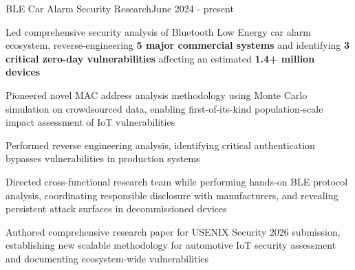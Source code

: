 \begin{joblong}{BLE Car Alarm Security Research}{June 2024 - present}
	\item Led comprehensive security analysis of Bluetooth Low Energy car alarm ecosystem, reverse-engineering \textbf{5 major commercial systems} and identifying \textbf{3 critical zero-day vulnerabilities} affecting an estimated \textbf{1.4+ million devices}
	\item Pioneered novel MAC address analysis methodology using Monte Carlo simulation on crowdsourced data, enabling first-of-its-kind population-scale impact assessment of IoT vulnerabilities
	\item Performed reverse engineering analysis, identifying critical authentication bypasses vulnerabilities in production systems
	\item Directed cross-functional research team while performing hands-on BLE protocol analysis, coordinating responsible disclosure with manufacturers, and revealing persistent attack surfaces in decommissioned devices
	\item Authored comprehensive research paper for USENIX Security 2026 submission, establishing new scalable methodology for automotive IoT security assessment and documenting ecosystem-wide vulnerabilities
\end{joblong}
